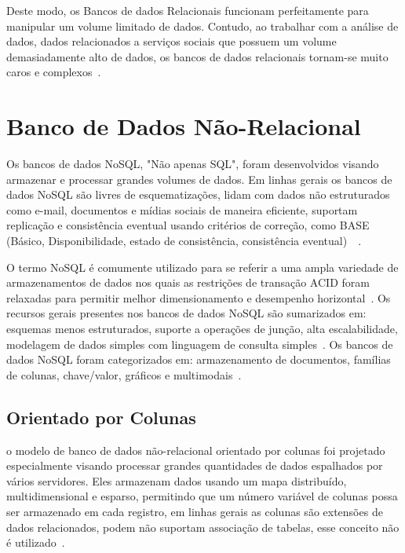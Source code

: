 \documentclass[a4paper,12pt,onecolumn,titlepage]{article}
\begin{document}
Deste modo, os Bancos de dados Relacionais funcionam perfeitamente para manipular um volume limitado de dados. Contudo, ao trabalhar com a análise de dados, dados relacionados a serviços sociais que possuem um volume demasiadamente alto de dados, os bancos de dados relacionais tornam-se muito caros e complexos~\citep{ramesh:2016}.

\section{Banco de Dados Não-Relacional}
\label{sec:nao-relacional}

Os bancos de dados NoSQL, "Não apenas SQL", foram desenvolvidos visando armazenar e processar grandes volumes de dados. Em linhas gerais os bancos de dados NoSQL são livres de esquematizações, lidam com dados não estruturados como e-mail, documentos e mídias sociais de maneira eficiente, suportam replicação e consistência eventual usando critérios de correção, como BASE (Básico, Disponibilidade, estado de consistência, consistência eventual)~\citep{mohamed:2014}~\citep{ramesh:2016}.

O termo NoSQL é comumente utilizado para se referir a uma ampla variedade de armazenamentos de dados nos quais as restrições de transação ACID foram relaxadas para permitir melhor dimensionamento e desempenho horizontal~\citep{rafique:2018}. Os recursos gerais presentes nos bancos de dados NoSQL são sumarizados em: esquemas menos estruturados, suporte a operações de junção, alta escalabilidade, modelagem de dados simples com linguagem de consulta simples~\citep{ramesh:2016}. Os bancos de dados NoSQL foram categorizados em: armazenamento de documentos, famílias de colunas, chave/valor, gráficos e multimodais~\citep{aparicio:2016}.

\subsection{Orientado por Colunas}
\label{subsec:colunas}

o modelo de banco de dados não-relacional orientado por colunas foi projetado especialmente visando processar grandes quantidades de dados espalhados por vários servidores. Eles armazenam dados usando um mapa distribuído, multidimensional e esparso, permitindo que um número variável de colunas possa ser armazenado em cada registro, em linhas gerais as colunas são extensões de dados relacionados, podem não suportam associação de tabelas, esse conceito não é utilizado~\citep{patil:2017}. 
\end{document}
